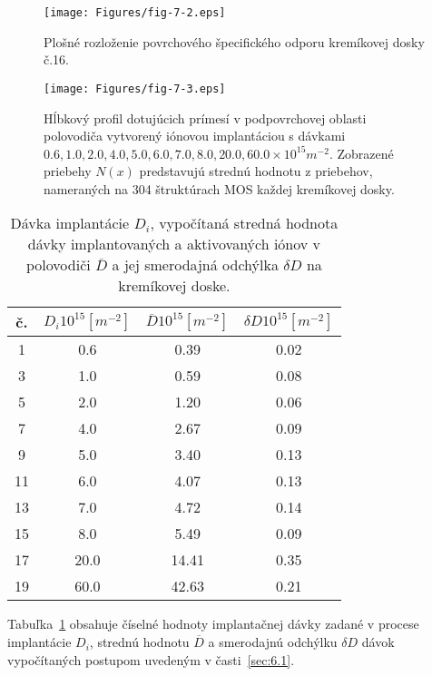 \begin{figure}[h!]\centering
  \texttt{[image: Figures/fig-7-2.eps]}
  \caption[Plošné rozloženie povrchového špecifického odporu
    kremíkovej dosky č.16]{Plošné rozloženie povrchového špecifického
    odporu kremíkovej dosky č.16.}\label{fig:7.2}
\end{figure}

\newpage
\begin{figure}[h!]\centering
  \texttt{[image: Figures/fig-7-3.eps]}
  \caption[Hĺbkový profil dotujúcich prímesí]{Hĺbkový profil
    dotujúcich prímesí v podpovrchovej oblasti polovodiča vytvorený
    iónovou implantáciou s dávkami $0.6, 1.0, 2.0, 4.0, 5.0, 6.0, 7.0,
    8.0, 20.0, 60.0 \times 10^{15} m^{-2}$. Zobrazené priebehy $N(x)$
    predstavujú strednú hodnotu z priebehov, nameraných na 304
    štruktúrach MOS každej kremíkovej dosky.}\label{fig:7.3}
\end{figure}

\begin{table}[h!]\centering
  \begin{tabular}{c c c c}
    \hline
    č. & ${D_{i}}{10}^{15}[m^{-2}]$ & $\overline{D}{10}^{15}[m^{-2}]$ & $\delta{D}{10}^{15}[m^{-2}]$\\
    \hline
     1 &  0.6 &  0.39 &  0.02\\
     3 &  1.0 &  0.59 &  0.08\\
     5 &  2.0 &  1.20 &  0.06\\
     7 &  4.0 &  2.67 &  0.09\\
     9 &  5.0 &  3.40 &  0.13\\
    11 &  6.0 &  4.07 &  0.13\\
    13 &  7.0 &  4.72 &  0.14\\
    15 &  8.0 &  5.49 &  0.09\\
    17 & 20.0 & 14.41 &  0.35\\
    19 & 60.0 & 42.63 &  0.21\\
    \hline
  \end{tabular}
  \caption[Dávky implantácie $D_{i}$]{Dávka implantácie $D_{i}$,
    vypočítaná stredná hodnota dávky implantovaných a aktivovaných
    iónov v polovodiči $\overline D$ a jej smerodajná odchýlka $\delta
    D$ na kremíkovej doske.}\label{tab:7.2}
\end{table}

Tabuľka~\ref{tab:7.2} obsahuje číselné hodnoty implantačnej dávky
zadané v procese implantácie $D_{i}$, strednú hodnotu $\overline D$ a
smerodajnú odchýlku $\delta D$ dávok vypočítaných postupom uvedeným v
časti~\ref{sec:6.1}.

